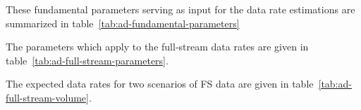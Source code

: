 These fundamental parameters serving as input for the data rate estimations are summarized in table~\ref{tab:ad-fundamental-parameters}



The parameters which apply to the full-stream data rates are given in table~\ref{tab:ad-full-stream-parameters}.



The expected data rates for two scenarios of FS data are given in table~\ref{tab:ad-full-stream-volume}.


